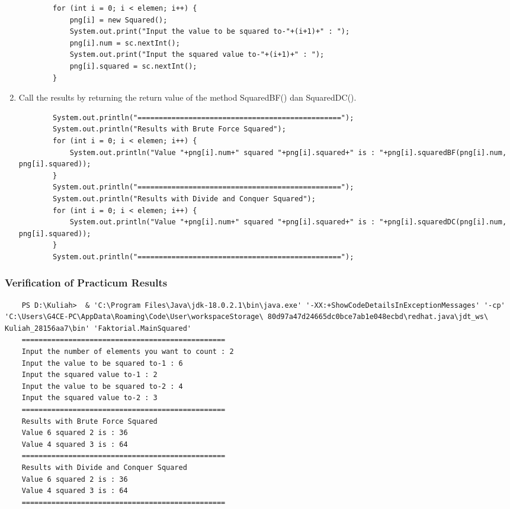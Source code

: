 \documentclass[12pt,titlepage]{article}
\begin{document}
\begin{enumerate}
\begin{verbatim}
        for (int i = 0; i < elemen; i++) {
            png[i] = new Squared();
            System.out.print("Input the value to be squared to-"+(i+1)+" : ");
            png[i].num = sc.nextInt();
            System.out.print("Input the squared value to-"+(i+1)+" : ");
            png[i].squared = sc.nextInt();
        }
    \end{verbatim}
    \item Call the results by returning the return value of the method SquaredBF() dan SquaredDC().
    \begin{verbatim}
        System.out.println("================================================");
        System.out.println("Results with Brute Force Squared");
        for (int i = 0; i < elemen; i++) {
            System.out.println("Value "+png[i].num+" squared "+png[i].squared+" is : "+png[i].squaredBF(png[i].num, png[i].squared));
        }
        System.out.println("================================================");
        System.out.println("Results with Divide and Conquer Squared");
        for (int i = 0; i < elemen; i++) {
            System.out.println("Value "+png[i].num+" squared "+png[i].squared+" is : "+png[i].squaredDC(png[i].num, png[i].squared));
        }
        System.out.println("================================================");
    \end{verbatim}
\end{enumerate}

\subsubsection{Verification of Practicum Results}

\begin{verbatim}
    PS D:\Kuliah>  & 'C:\Program Files\Java\jdk-18.0.2.1\bin\java.exe' '-XX:+ShowCodeDetailsInExceptionMessages' '-cp' 'C:\Users\G4CE-PC\AppData\Roaming\Code\User\workspaceStorage\ 80d97a47d24665dc0bce7ab1e048ecbd\redhat.java\jdt_ws\ Kuliah_28156aa7\bin' 'Faktorial.MainSquared'
    ================================================
    Input the number of elements you want to count : 2
    Input the value to be squared to-1 : 6
    Input the squared value to-1 : 2
    Input the value to be squared to-2 : 4
    Input the squared value to-2 : 3
    ================================================
    Results with Brute Force Squared
    Value 6 squared 2 is : 36
    Value 4 squared 3 is : 64
    ================================================
    Results with Divide and Conquer Squared
    Value 6 squared 2 is : 36
    Value 4 squared 3 is : 64
    ================================================
\end{verbatim}
\end{document}
